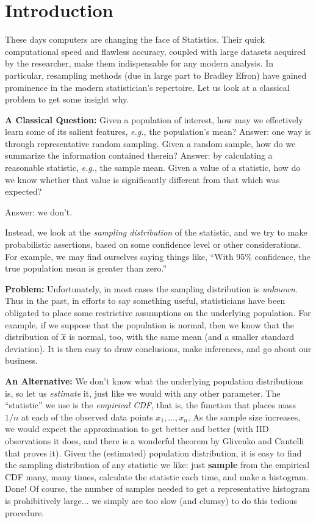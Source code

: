 \documentclass[captions=tableheading]{scrbook}
\begin{document}
\section{Introduction}
\label{sec-5_2}


These days computers are changing the face of Statistics. Their quick computational speed and flawless accuracy, coupled with large datasets acquired by the researcher, make them indispensable for any modern analysis. In particular, resampling methods (due in large part to Bradley Efron) have gained prominence in the modern statistician's repertoire. Let us look at a classical problem to get some insight
why.

\textbf{A Classical Question:} Given a population of interest, how may we effectively learn some of its salient features, \emph{e.g.}, the population's mean? Answer: one way is through representative random sampling. Given a random sample, how do we summarize the information contained therein? Answer: by calculating a reasonable statistic, \emph{e.g.}, the sample mean. Given a value of a statistic, how do we know whether that value is significantly different from that which was expected?

\begin{center}
Answer: we don't. 
\end{center}

Instead, we look at the \emph{sampling distribution} of the statistic, and we try to make probabilistic assertions, based on some confidence level or other considerations. For example, we may find ourselves saying things like, ``With 95\% confidence, the true population mean is greater than zero.''

\textbf{Problem:} Unfortunately, in most cases the sampling distribution is \emph{unknown}. Thus in the past, in efforts to say something useful, statisticians have been obligated to place some restrictive assumptions on the underlying population. For example, if we suppose that the population is normal, then we know that the distribution of $\overline{x}$ is normal, too, with the same mean (and a smaller standard deviation). It is then easy to draw conclusions, make inferences, and go about our business.

\textbf{An Alternative:} We don't know what the underlying population distributions is, so let us \emph{estimate} it, just like we would with any other parameter. The ``statistic'' we use is the \emph{empirical CDF}, that is, the function that places mass $1/n$ at each of the observed data points $x_{1},\ldots,x_{n}$. As the sample size increases, we would expect the approximation to get better and better (with IID observations it does, and there is a wonderful theorem by Glivenko and Cantelli that proves it). Given the (estimated) population distribution, it is easy to find the sampling distribution of any statistic we like: just \textbf{sample} from the empirical CDF many, many times, calculate the statistic each time, and make a histogram. Done! Of course, the number of samples needed to get a representative histogram is prohibitively large$\ldots$ we simply are too slow (and clumsy) to do this tedious procedure.
\end{document}
